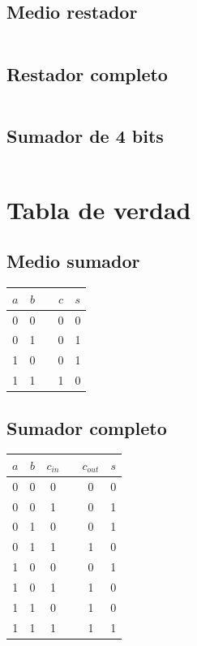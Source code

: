 \documentclass[11pt]{article}
\begin{document}
	\subsection{Medio restador}
	\inputminted[tabsize=4,breaklines,linenos]{vhdl}{halfSubtractor.rpt}
	
	\subsection{Restador completo}
	\inputminted[tabsize=4,breaklines,linenos]{vhdl}{fullSubtractor.rpt}
	
	\subsection{Sumador de 4 bits}
	\inputminted[tabsize=4,breaklines,linenos]{vhdl}{fourBitsAdder.rpt}
	
	\section{Tabla de verdad}
	\subsection{Medio sumador}
	\begin{table}[H]
	    \centering
	    \begin{tabular}{|c|c|c|c|c|}
	         \hline
	         $a$ & $b$ & & $c$ & $s$ \\ \hline
	         0 & 0 & & 0 & 0 \\ \hline
	         0 & 1 & & 0 & 1 \\ \hline
	         1 & 0 & & 0 & 1 \\ \hline
	         1 & 1 & & 1 & 0 \\ \hline
	    \end{tabular}
	\end{table}
	
	\subsection{Sumador completo}
	\begin{table}[H]
	    \centering
	    \begin{tabular}{|c|c|c|c|c|c|}
	         \hline
	         $a$ & $b$ & $c_{in}$ & & $c_{out}$ & $s$ \\ \hline
	         0 & 0 & 0 & & 0 & 0 \\ \hline
	         0 & 0 & 1 & & 0 & 1 \\ \hline
	         0 & 1 & 0 & & 0 & 1 \\ \hline
	         0 & 1 & 1 & & 1 & 0 \\ \hline
	         1 & 0 & 0 & & 0 & 1 \\ \hline
	         1 & 0 & 1 & & 1 & 0 \\ \hline
	         1 & 1 & 0 & & 1 & 0 \\ \hline
	         1 & 1 & 1 & & 1 & 1 \\ \hline
	    \end{tabular}
	\end{table}
	
\end{document}
